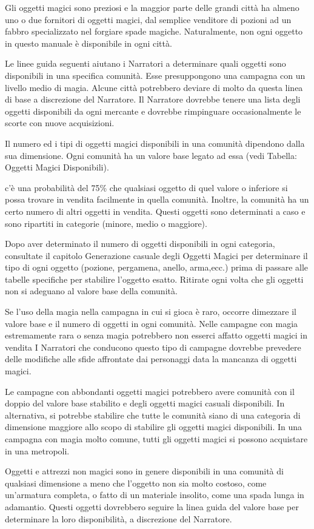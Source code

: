 \begin{multicols}{2}

	\bigskip

	Gli oggetti magici sono preziosi e la maggior parte delle grandi città ha almeno uno o due fornitori di oggetti magici, dal semplice venditore di pozioni ad un fabbro specializzato nel forgiare spade magiche. Naturalmente, non ogni oggetto in questo manuale è disponibile in ogni città.

	Le linee guida seguenti aiutano i Narratori a determinare quali oggetti sono disponibili in una specifica comunità. Esse presuppongono una campagna con un livello medio di magia. Alcune città potrebbero deviare di molto da questa linea di base a discrezione del Narratore. Il Narratore dovrebbe tenere una lista degli oggetti disponibili da ogni mercante e dovrebbe rimpinguare occasionalmente le scorte con nuove acquisizioni.

	Il numero ed i tipi di oggetti magici disponibili in una comunità dipendono dalla sua dimensione. Ogni comunità ha un valore base legato ad essa (vedi Tabella: Oggetti Magici Disponibili).

	c'è una probabilità del 75\% che qualsiasi oggetto di quel valore o inferiore si possa trovare in vendita facilmente in quella comunità. Inoltre, la comunità ha un certo numero di altri oggetti in vendita. Questi oggetti sono determinati a caso e sono ripartiti in categorie (minore, medio o maggiore).

	Dopo aver determinato il numero di oggetti disponibili in ogni categoria, consultate il capitolo Generazione casuale degli Oggetti Magici per determinare il tipo di ogni oggetto (pozione, pergamena, anello, arma,ecc.) prima di passare alle tabelle specifiche per stabilire l'oggetto esatto. Ritirate ogni volta che gli oggetti non si adeguano al valore base della comunità.

	Se l'uso della magia nella campagna in cui si gioca è raro, occorre dimezzare il valore base e il numero di oggetti in ogni comunità. Nelle campagne con magia estremamente rara o senza magia potrebbero non esserci affatto oggetti magici in vendita I Narratori che conducono questo tipo di campagne dovrebbe prevedere delle modifiche alle sfide affrontate dai personaggi data la mancanza di oggetti magici.

	Le campagne con abbondanti oggetti magici potrebbero avere comunità con il doppio del valore base stabilito e degli oggetti magici casuali disponibili. In alternativa, si potrebbe stabilire che tutte le comunità siano di una categoria di dimensione maggiore allo scopo di stabilire gli oggetti magici disponibili. In una campagna con magia molto comune, tutti gli oggetti magici si possono acquistare in una metropoli.

	Oggetti e attrezzi non magici sono in genere disponibili in una comunità di qualsiasi dimensione a meno che l'oggetto non sia molto costoso, come un'armatura completa, o fatto di un materiale insolito, come una spada lunga in adamantio. Questi oggetti dovrebbero seguire la linea guida del valore base per determinare la loro disponibilità, a discrezione del Narratore.

\end{multicols}

